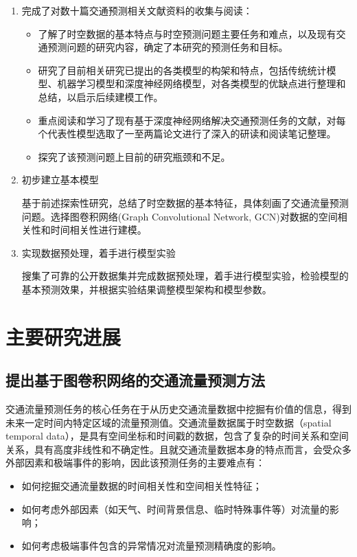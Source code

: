\documentclass[UTF8]{ctexart}
\numberwithin{equation}{section}
\begin{document}
\begin{enumerate}
	\def\labelenumi{\arabic{enumi}.}
	\item
	完成了对数十篇交通预测相关文献资料的收集与阅读：
	
	\begin{itemize}
		\item
		了解了时空数据的基本特点与时空预测问题主要任务和难点，以及现有交通预测问题的研究内容，确定了本研究的预测任务和目标。
		\item
		研究了目前相关研究已提出的各类模型的构架和特点，包括传统统计模型、机器学习模型和深度神经网络模型，对各类模型的优缺点进行整理和总结，以启示后续建模工作。
		\item
		重点阅读和学习了现有基于深度神经网络解决交通预测任务的文献，对每个代表性模型选取了一至两篇论文进行了深入的研读和阅读笔记整理。
		\item
		探究了该预测问题上目前的研究瓶颈和不足。
	\end{itemize}
	\item
	初步建立基本模型
	
	基于前述探索性研究，总结了时空数据的基本特征，具体刻画了交通流量预测问题。选择图卷积网络(Graph
	Convolutional Network, GCN)对数据的空间相关性和时间相关性进行建模。
	\item
	实现数据预处理，着手进行模型实验
	
	搜集了可靠的公开数据集并完成数据预处理，着手进行模型实验，检验模型的基本预测效果，并根据实验结果调整模型架构和模型参数。
\end{enumerate}



\section{主要研究进展}

\subsection{提出基于图卷积网络的交通流量预测方法}
交通流量预测任务的核心任务在于从历史交通流量数据中挖掘有价值的信息，得到未来一定时间内特定区域的流量预测值。交通流量数据属于时空数据（spatial temporal data），是具有空间坐标和时间戳的数据，包含了复杂的时间关系和空间关系，具有高度非线性和不确定性。且就交通流量数据本身的特点而言，会受众多外部因素和极端事件的影响，因此该预测任务的主要难点有：
\begin{itemize}
	\item 如何挖掘交通流量数据的时间相关性和空间相关性特征；
	\item 如何考虑外部因素（如天气、时间背景信息、临时特殊事件等）对流量的影响；
	\item 如何考虑极端事件包含的异常情况对流量预测精确度的影响。
\end{itemize}
\end{document}
